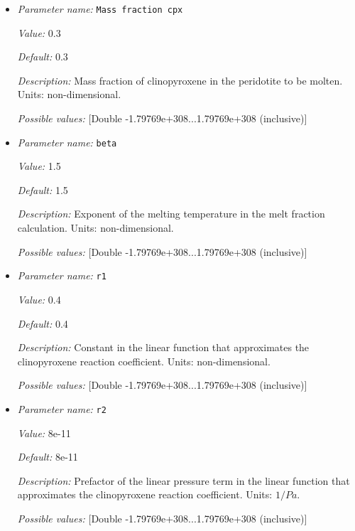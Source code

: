 \begin{itemize}
{\it Default:} -611.4


{\it Description:} Prefactor of the quadratic depletion term in the quadratic function that approximates the melt fraction of pyroxenite. Units: $°C/(Pa^2)$.


{\it Possible values:} [Double -1.79769e+308...1.79769e+308 (inclusive)]
\item {\it Parameter name:} {\tt Mass fraction cpx}


{\it Value:} 0.3


{\it Default:} 0.3


{\it Description:} Mass fraction of clinopyroxene in the peridotite to be molten. Units: non-dimensional.


{\it Possible values:} [Double -1.79769e+308...1.79769e+308 (inclusive)]
\item {\it Parameter name:} {\tt beta}


{\it Value:} 1.5


{\it Default:} 1.5


{\it Description:} Exponent of the melting temperature in the melt fraction calculation. Units: non-dimensional.


{\it Possible values:} [Double -1.79769e+308...1.79769e+308 (inclusive)]
\item {\it Parameter name:} {\tt r1}


{\it Value:} 0.4


{\it Default:} 0.4


{\it Description:} Constant in the linear function that approximates the clinopyroxene reaction coefficient. Units: non-dimensional.


{\it Possible values:} [Double -1.79769e+308...1.79769e+308 (inclusive)]
\item {\it Parameter name:} {\tt r2}


{\it Value:} 8e-11


{\it Default:} 8e-11


{\it Description:} Prefactor of the linear pressure term in the linear function that approximates the clinopyroxene reaction coefficient. Units: $1/Pa$.


{\it Possible values:} [Double -1.79769e+308...1.79769e+308 (inclusive)]
\end{itemize}

